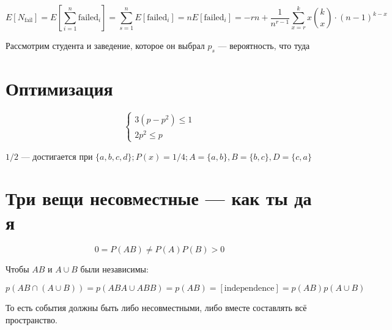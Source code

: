 \documentclass[12pt, a4paper]{article}
\begin{document}
\begin{equation}
  E[N_{\mathrm{fail}}] = E\left[\sum_{i = 1}^n \mathrm{failed}_i\right] = \sum_{s = 1}^n E[\mathrm{failed}_i] = n E[\mathrm{failed}_i] = 
  -rn + \frac{1}{n^{r - 1}}\sum_{x = r}^{k} x \binom{k}{x} \cdot (n - 1)^{k - x}
\end{equation}

Рассмотрим студента и заведение, которое он выбрал $p_s$ — вероятность, что туда

\section{Оптимизация}

\begin{equation}
  \begin{cases}
    3 (p - p^2) \leqslant 1 \\
    2p^2 \leqslant p
  \end{cases}
\end{equation}

$1/2$ — достигается при $\{a, b, c, d\}; P(x) = 1/4; A = \{a, b\}, B = \{b, c\}, D = \{c, a\}$


\section{Три вещи несовместные — как ты да я}

\begin{equation}
  0 = P(AB) \neq P(A) P(B) > 0
\end{equation}

Чтобы $AB$ и $A \cup B$ были независимы:

\begin{equation}
  p(AB \cap (A \cup B)) = p(ABA \cup ABB) = p(AB) = [\text{independence}] = p(AB)p(A \cup B)
\end{equation}

То есть события должны быть либо несовместными, либо вместе составлять всё пространство.
\end{document}
